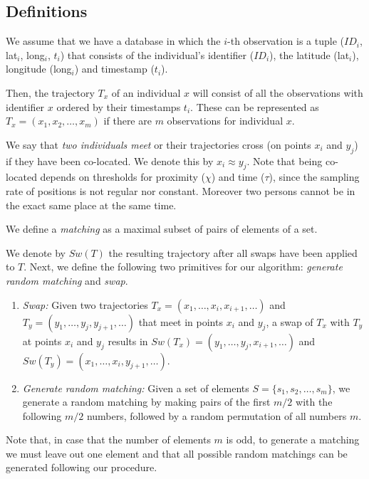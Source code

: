 \documentclass[review]{elsarticle}
\begin{document}
\subsection{Definitions}
We assume that we have a database in which the $i$-th observation is a tuple ($ID_i$, lat$_i$, long$_i$, $t_i$) that
consists of the individual's identifier ($ID_i$), the latitude (lat$_i$), longitude (long$_i$) and timestamp ($t_i$).

Then, the trajectory $T_x$ of an individual \texttt{$x$} will consist of all the observations with identifier \texttt{$x$} ordered by their timestamps \texttt{$t_i$}.
These can be represented as $T_x = (x_1, x_2, \ldots, x_m)$ if there are $m$ observations for individual $x$.


We say that \emph{two individuals meet} or their trajectories cross (on points $x_i$ and $y_j$) if they have been co-located. We denote this by $x_i \approx y_j$. Note that being co-located depends on thresholds for proximity ($\chi$) and time ($\tau$), since the sampling rate of positions is not regular nor constant. Moreover two persons cannot be in the exact same place at the same time.

We define a \emph{matching} as a maximal subset of pairs of elements of a set.

We denote by $Sw(T)$ the resulting trajectory after all swaps have been applied to $T$.
Next, we define the following two primitives for our algorithm: \emph{generate random matching} and \emph{swap}.
\begin{enumerate}

\item \emph{Swap:}
Given two trajectories $T_x = (x_1, \ldots, x_i, x_{i+1}, \ldots)$ and \linebreak
$T_y= (y_1, \ldots, y_j, y_{j+1}, \ldots)$ that meet in points $x_i$ and $y_j$, a swap of $T_x$ with $T_y$ at points $x_i$ and $y_j$ results in $Sw(T_x) = (y_1, \ldots, y_j, x_{i+1}, \ldots)$ and
\linebreak
$Sw(T_y)= (x_1, \ldots, x_i, y_{j+1}, \ldots)$.
\item \emph{Generate random matching:}
Given a set of elements $S = \{s_1, s_2,\ldots, s_m\}$, we generate a random matching by making pairs of the first $m/2$ with the following $m/2$ numbers, followed by a random permutation of all numbers $m$.
\end{enumerate}

Note that, in case that the number of elements $m$ is odd, to generate a matching we must leave out one element and that all possible random matchings can be generated following our procedure.
\end{document}
